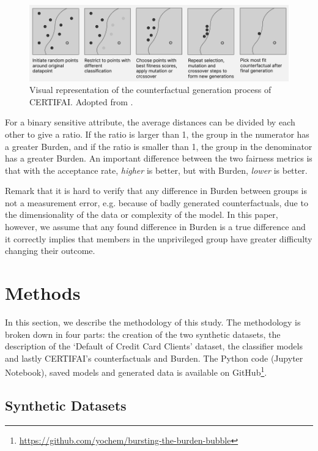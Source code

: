 \documentclass[runningheads]{llncs}
\begin{document}
\begin{figure}
    \centering
    \includegraphics[width=\textwidth]{img/counterfactual_generation.png}
    \caption{Visual representation of the counterfactual generation process of
    CERTIFAI. Adopted from \cite{certifai}.}
    \label{fig:cf-generation}
\end{figure}

For a binary sensitive attribute, the average distances can be divided by each
other to give a ratio. If the ratio is larger than 1, the group in the
numerator has a greater \gls{Burden}, and if the ratio is smaller than 1, the
group in the denominator has a greater \gls{Burden}. An important difference
between the two fairness metrics is that with the acceptance rate,
\emph{higher} is better, but with Burden, \emph{lower} is better.

Remark that it is hard to verify that any difference in \gls{Burden} between
groups is not a measurement error, e.g. because of badly generated
counterfactuals, due to the dimensionality of the data or complexity of the
model. In this paper, however, we assume that any found difference in Burden is
a true difference and it correctly implies that members in the unprivileged
group have greater difficulty changing their outcome.



\section{Methods}\label{sec:methods}
In this section, we describe the methodology of this study. The methodology is
broken down in four parts: the creation of the two synthetic datasets, the
description of the `Default of Credit Card Clients' dataset, the classifier
models and lastly CERTIFAI's counterfactuals and Burden. The Python code
(Jupyter Notebook), saved models and generated data is available on
GitHub\footnote{\url{https://github.com/yochem/bursting-the-burden-bubble}}.

\subsection{Synthetic Datasets}\label{sec:syndata}
\end{document}
